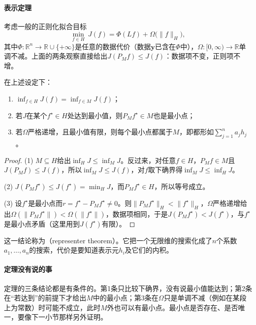 \paragraph{表示定理}
考虑一般的正则化拟合目标
\begin{equation}
  \min_{f\in H}\ J(f)=\Phi(Lf)+\Omega\bigl(\|f\|_H\bigr),
  \label{eq:opt-fit-representer-problem}
\end{equation}
其中$\Phi:\mathbb R^n\to\mathbb R\cup\{+\infty\}$是任意的数据代价（数据$\bm y$已含在$\Phi$中），$\Omega:[0,\infty)\to\mathbb R$单调不减。上面的两条观察直接给出$J(P_Mf)\le J(f)$：数据项不变，正则项不增。

\begin{theorem}[表示定理]
\label{thm:opt-fit-representer}
在上述设定下：
\begin{enumerate}
  \item $\inf_{f\in H}J(f)=\inf_{f\in M}J(f)$；
  \item 若$J$在某个$f^\star\in H$处达到最小值，则$P_Mf^\star\in M$也是最小点；
  \item 若$\Omega$严格递增，且最小值有限，则每个最小点都属于$M$，即都形如$\sum_{j=1}^na_jh_j$。
\end{enumerate}
\end{theorem}

\begin{proof}
(1) $M\subseteq H$给出$\inf_HJ\le\inf_MJ$。反过来，对任意$f\in H$，$P_Mf\in M$且$J(P_Mf)\le J(f)$，所以$\inf_MJ\le J(f)$，对$f$取下确界得$\inf_MJ\le\inf_HJ$。

(2) $J(P_Mf^\star)\le J(f^\star)=\min_HJ$，而$P_Mf^\star\in H$，所以等号成立。

(3) 设$f^\star$是最小点而$r=f^\star-P_Mf^\star\ne0$。则$\|P_Mf^\star\|_H<\|f^\star\|_H$，$\Omega$严格递增给出$\Omega(\|P_Mf^\star\|)<\Omega(\|f^\star\|)$，数据项相同，于是$J(P_Mf^\star)<J(f^\star)$，与$f^\star$是最小点矛盾（这里用到$J(f^\star)$有限）。
\end{proof}

这一结论称为（representer theorem）。它把一个无限维的搜索化成了$n$个系数$a_1,\dots,a_n$的搜索，代价是要知道表示元$h_i$及它们的内积。

\paragraph{定理没有说的事}
定理的三条结论都是有条件的。第1条只比较下确界，没有说最小值能达到；第2条在“若达到”的前提下才给出$M$中的最小点；第3条在$\Omega$只是单调不减（例如在某段上为常数）时可能不成立，此时$M$外也可以有最小点。最小点是否存在、是否唯一，要像下一小节那样另外证明。

